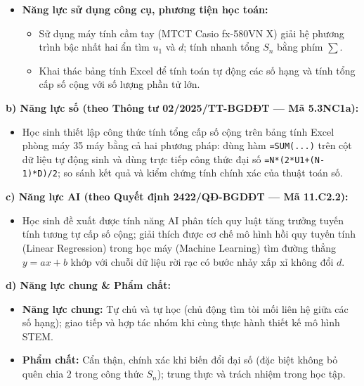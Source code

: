 \documentclass[12pt, a4paper]{article}
\begin{document}
\begin{itemize}[leftmargin=1.5em]
\begin{itemize}
        \item Sử dụng chính xác các thuật ngữ: cấp số cộng, công sai, số hạng tổng quát, tổng $n$ số hạng đầu; trình bày lời giải toán học mạch lạc, rõ ràng từng bước thế công thức.
    \end{itemize}
    \item \textbf{Năng lực sử dụng công cụ, phương tiện học toán:}
    \begin{itemize}
        \item Sử dụng máy tính cầm tay (MTCT Casio fx-580VN X) giải hệ phương trình bậc nhất hai ẩn tìm $u_1$ và $d$; tính nhanh tổng $S_n$ bằng phím $\sum$.
        \item Khai thác bảng tính Excel để tính toán tự động các số hạng và tính tổng cấp số cộng với số lượng phần tử lớn.
    \end{itemize}
\end{itemize}


\textbf{b) Năng lực số (theo Thông tư 02/2025/TT-BGDĐT --- Mã 5.3NC1a):}
\begin{itemize}[leftmargin=1.5em]
    \item Học sinh thiết lập công thức tính tổng cấp số cộng trên bảng tính Excel phòng máy 35 máy bằng cả hai phương pháp: dùng hàm \texttt{=SUM(...)} trên cột dữ liệu tự động sinh và dùng trực tiếp công thức đại số \texttt{=N*(2*U1+(N-1)*D)/2}; so sánh kết quả và kiểm chứng tính chính xác của thuật toán số.
\end{itemize}


\textbf{c) Năng lực AI (theo Quyết định 2422/QĐ-BGDĐT --- Mã 11.C2.2):}
\begin{itemize}[leftmargin=1.5em]
    \item Học sinh đề xuất được tính năng AI phân tích quy luật tăng trưởng tuyến tính tương tự cấp số cộng; giải thích được cơ chế mô hình hồi quy tuyến tính (Linear Regression) trong học máy (Machine Learning) tìm đường thẳng $y = ax + b$ khớp với chuỗi dữ liệu rời rạc có bước nhảy xấp xỉ không đổi $d$.
\end{itemize}


\textbf{d) Năng lực chung \& Phẩm chất:}
\begin{itemize}[leftmargin=1.5em]
    \item \textbf{Năng lực chung:} Tự chủ và tự học (chủ động tìm tòi mối liên hệ giữa các số hạng); giao tiếp và hợp tác nhóm khi cùng thực hành thiết kế mô hình STEM.
    \item \textbf{Phẩm chất:} Cẩn thận, chính xác khi biến đổi đại số (đặc biệt không bỏ quên chia $2$ trong công thức $S_n$); trung thực và trách nhiệm trong học tập.
\end{itemize}
\end{document}
